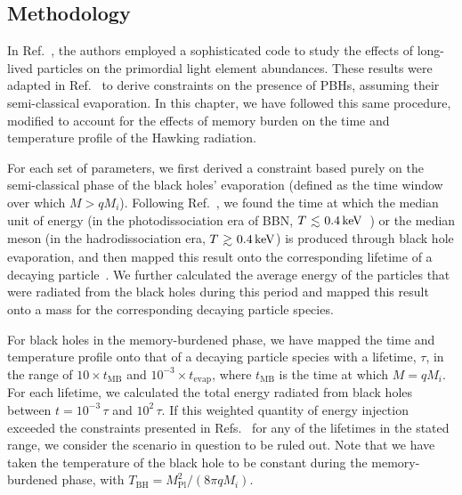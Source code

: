 \begin{subappendices}

\section{Methodology}
\label{sec:ch10-app-methodology}

In Ref.~\cite{Kawasaki:2017bqm}, the authors employed a sophisticated code to study the effects of long-lived particles on the primordial light element abundances. These results were adapted in Ref.~\cite{Keith:2020jww} to derive constraints on the presence of PBHs, assuming their semi-classical evaporation.  In this chapter, we have followed this same procedure, modified to account for the effects of memory burden on the time and temperature profile of the Hawking radiation.

For each set of parameters, we first derived a constraint based purely on the semi-classical phase of the black holes' evaporation (defined as the time window over which $M > q M_{i}$). Following Ref.~\cite{Keith:2020jww}, we found the time at which the median unit of energy (in the photodissociation era of BBN, $T \lsim 0.4\,\mathrm{keV}$~\cite{Kawasaki:1994af}) or the median meson (in the hadrodissociation era, $T \gsim 0.4\,\mathrm{keV}$) is produced through black hole evaporation, and then mapped this result onto the corresponding lifetime of a decaying particle~\cite{Kawasaki:1994af}. We further calculated the average energy of the particles that were radiated from the black holes during this period and mapped this result onto a mass for the corresponding decaying particle species.

For black holes in the memory-burdened phase, we have mapped the time and temperature profile onto that of a decaying particle species with a lifetime, $\tau$, in the range of $10 \times t_\mathrm{MB}$ and $10^{-3} \times t_\mathrm{evap}$, where $t_\mathrm{MB}$ is the time at which $M=q M_{i}$. For each lifetime, we calculated the total energy radiated from black holes between $t= 10^{-3}\,\tau$ and $10^{2}\,\tau$. If this weighted quantity of energy injection exceeded the constraints presented in Refs.~\cite{Keith:2020jww, Kawasaki:2017bqm} for any of the lifetimes in the stated range, we consider the scenario in question to be ruled out. Note that we have taken the temperature of the black hole to be constant during the memory-burdened phase, with $T_\mathrm{BH} = M^{2}_\mathrm{Pl}/(8 \pi q M_{i})$.


\end{subappendices}
